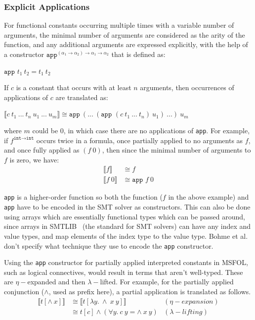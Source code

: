 \documentclass{article}
\begin{document}
	\subsubsection{Explicit Applications}
		For functional constants 
		occurring multiple times with 
		a variable number 
		of arguments, the minimal 
		number of arguments are 
		considered as the arity of the 
		function, and any additional 
		arguments are expressed 
		explicitly, with the help of a 
		constructor 
		$\texttt{app}^{(\alpha_1 \to 
		\alpha_2) \to \alpha_1 \to 
		\alpha_2}$ that is defined as:
		\begin{center}
			$\texttt{app }t_1\ t_2 = 
			t_1\ t_2$
		\end{center}
		If $c$ is a constant that 
		occurs with at least $n$
		arguments, then 
		occurrences of applications 
		of $c$ are translated as:
		\begin{center}
			$\llbracket c\ t_1\ ...\ t_n
			\ u_1\ ...\ u_m \rrbracket
			\cong \texttt{app}\ (...\ 
			(\texttt{app }(c\ t_1\ 
			...\ t_n)\ u_1)	\ ...)\ u_m$
		\end{center}
		where $m$ could be $0$, in which 
		case there are no applications 
		of \texttt{app}. For example, if 
		$f^{\texttt{int} \to \texttt{int}}$ 
		occurs twice in a formula, once 
		partially applied to no arguments 
		as $f$, and once fully applied as 
		$(f\ 0)$, then since the minimal 
		number of arguments to $f$ is 
		zero, we have:
		\begin{align*}
		\llbracket f \rrbracket &\cong
		f\\
		\llbracket f\ 0 \rrbracket &\cong
		\texttt{app } f\ 0
		\end{align*}
		
		\texttt{app} is a higher-order 
		function so both the function 
		($f$ in the above example) and 
		\texttt{app} have to be encoded 
		in the SMT solver as constructors.
		This can also be done using arrays 
		which are essentially functional 
		types which can be passed
		around, since arrays in 
		SMTLIB~\cite{BarFT-SMTLIB} (the 
		standard for SMT solvers)
		can have any index and value types, 
		and map elements of the index type 
		to the value type. Bohme et al. 
		don't specify what technique 
		they use to encode the 
		\texttt{app} constructor.
		
		Using the \texttt{app} constructor
		for partially applied interpreted 
		constants in MSFOL, such as 
		logical connectives, would result 
		in terms that aren't well-typed.
		These are $\eta-$expanded and 
		then $\lambda-$lifted. For example, 
		for the partially applied 
		conjunction ($\land$, used as prefix 
		here), a partial application is 
		translated as follows.
		\begin{align*}
			\llbracket t [\land\ x] 
			\rrbracket &\cong \llbracket 
			 t[\lambda y.\ \land\ x\ y]
			\rrbracket&(\eta-expansion)\\
			&\cong t[c]  \land (\forall y.\ 
			c\ y = \land\ x\ y) &(\lambda-lifting)
		\end{align*}
		
\end{document}
